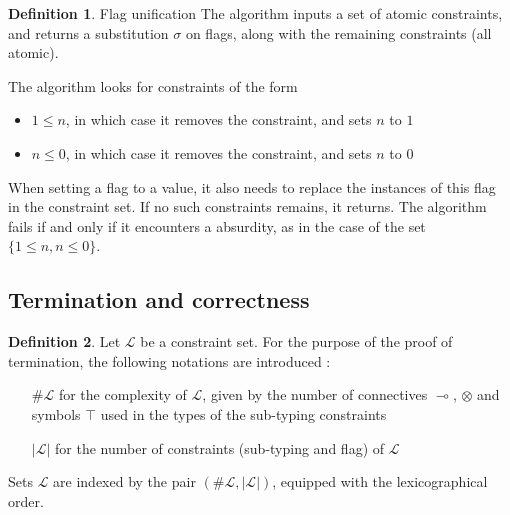 \documentclass[10pt]{article}
\theoremstyle{plain}
\theoremstyle{definition}
\newtheorem{defn}{Definition}[subsection] %
\begin{document}
\begin{defn}{Flag unification}
	The algorithm inputs a set of atomic constraints, and returns a substitution $\sigma$ on flags, along with
	the remaining constraints (all atomic).
	
	The algorithm looks for constraints of the form
	\begin{itemize}
		\item $1 \le n$, in which case it removes the constraint, and sets $n$ to $1$
		\item $n \le 0$, in which case it removes the constraint, and sets $n$ to $0$
	\end{itemize}	
	When setting a flag to a value, it also needs to replace the instances of this flag in the constraint set.
	If no such constraints remains, it returns. The algorithm fails if and only if it encounters a absurdity,
	as in the case of the set $\{ 1 \le n, n \le 0 \}$.
\end{defn}

\subsection{Termination and correctness}

\begin{defn} Let $\mathcal{L}$ be a constraint set. For the purpose of the proof of termination, the following notations are introduced :
	\begin{itemize}
		\item[$\#\mathcal{L}$] for the complexity of $\mathcal{L}$, given by the number of connectives $\multimap$,
			$\otimes$ and symbols $\top$ used in the types of the sub-typing constraints
		\item[$|\mathcal{L}|$] for the number of constraints (sub-typing and flag) of $\mathcal{L}$
	\end{itemize}
	Sets $\mathcal{L}$ are indexed by the pair $(\#\mathcal{L}, |\mathcal{L}|)$, equipped with the lexicographical order.
\end{defn}
\end{document}
